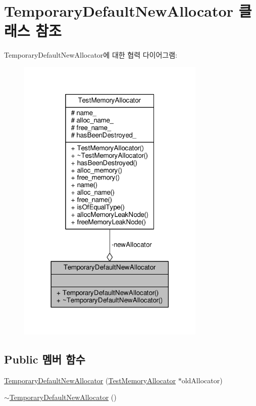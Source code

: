 \hypertarget{class_temporary_default_new_allocator}{}\section{Temporary\+Default\+New\+Allocator 클래스 참조}
\label{class_temporary_default_new_allocator}


Temporary\+Default\+New\+Allocator에 대한 협력 다이어그램\+:
\nopagebreak
\begin{figure}[H]
\begin{center}
\leavevmode
\includegraphics[width=254pt]{class_temporary_default_new_allocator__coll__graph}
\end{center}
\end{figure}
\subsection*{Public 멤버 함수}
\begin{DoxyCompactItemize}
\item 
\hyperlink{class_temporary_default_new_allocator_a905d5d679052ba83087fe36c80af3108}{Temporary\+Default\+New\+Allocator} (\hyperlink{class_test_memory_allocator}{Test\+Memory\+Allocator} $\ast$old\+Allocator)
\item 
\hyperlink{class_temporary_default_new_allocator_abbffb4fc49a322e57f8b5766d4168ea8}{$\sim$\+Temporary\+Default\+New\+Allocator} ()
\end{DoxyCompactItemize}
